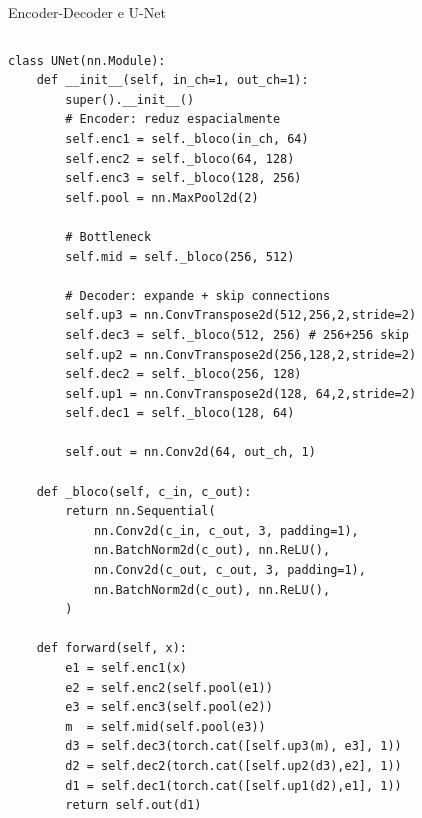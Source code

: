 \documentclass[aspectratio=169, 10pt]{beamer}
\begin{document}
\begin{frame}[fragile]{Encoder-Decoder e U-Net}
\begin{columns}
\begin{lstlisting}[style=small]
class UNet(nn.Module):
    def __init__(self, in_ch=1, out_ch=1):
        super().__init__()
        # Encoder: reduz espacialmente
        self.enc1 = self._bloco(in_ch, 64)
        self.enc2 = self._bloco(64, 128)
        self.enc3 = self._bloco(128, 256)
        self.pool = nn.MaxPool2d(2)

        # Bottleneck
        self.mid = self._bloco(256, 512)

        # Decoder: expande + skip connections
        self.up3 = nn.ConvTranspose2d(512,256,2,stride=2)
        self.dec3 = self._bloco(512, 256) # 256+256 skip
        self.up2 = nn.ConvTranspose2d(256,128,2,stride=2)
        self.dec2 = self._bloco(256, 128)
        self.up1 = nn.ConvTranspose2d(128, 64,2,stride=2)
        self.dec1 = self._bloco(128, 64)

        self.out = nn.Conv2d(64, out_ch, 1)

    def _bloco(self, c_in, c_out):
        return nn.Sequential(
            nn.Conv2d(c_in, c_out, 3, padding=1),
            nn.BatchNorm2d(c_out), nn.ReLU(),
            nn.Conv2d(c_out, c_out, 3, padding=1),
            nn.BatchNorm2d(c_out), nn.ReLU(),
        )

    def forward(self, x):
        e1 = self.enc1(x)
        e2 = self.enc2(self.pool(e1))
        e3 = self.enc3(self.pool(e2))
        m  = self.mid(self.pool(e3))
        d3 = self.dec3(torch.cat([self.up3(m), e3], 1))
        d2 = self.dec2(torch.cat([self.up2(d3),e2], 1))
        d1 = self.dec1(torch.cat([self.up1(d2),e1], 1))
        return self.out(d1)
\end{lstlisting}

\end{columns}
\end{frame}
\end{document}
